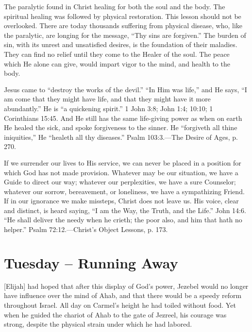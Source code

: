 \documentclass[a4paper, 10pt, twoside, headings=small]{scrartcl}
\begin{document}
\begin{multicols}{2}
The paralytic found in Christ healing for both the soul and the body. The spiritual healing was followed by physical restoration. This lesson should not be overlooked. There are today thousands suffering from physical disease, who, like the paralytic, are longing for the message, “Thy sins are forgiven.” The burden of sin, with its unrest and unsatisfied desires, is the foundation of their maladies. They can find no relief until they come to the Healer of the soul. The peace which He alone can give, would impart vigor to the mind, and health to the body.

Jesus came to “destroy the works of the devil.” “In Him was life,” and He says, “I am come that they might have life, and that they might have it more abundantly.” He is “a quickening spirit.” 1 John 3:8; John 1:4; 10:10; 1 Corinthians 15:45. And He still has the same life-giving power as when on earth He healed the sick, and spoke forgiveness to the sinner. He “forgiveth all thine iniquities,” He “healeth all thy diseases.” Psalm 103:3.—The Desire of Ages, p. 270.

If we surrender our lives to His service, we can never be placed in a position for which God has not made provision. Whatever may be our situation, we have a Guide to direct our way; whatever our perplexities, we have a sure Counselor; whatever our sorrow, bereavement, or loneliness, we have a sympathizing Friend. If in our ignorance we make missteps, Christ does not leave us. His voice, clear and distinct, is heard saying, “I am the Way, the Truth, and the Life.” John 14:6. “He shall deliver the needy when he crieth; the poor also, and him that hath no helper.” Psalm 72:12.—Christ’s Object Lessons, p. 173.

\section*{Tuesday – Running Away}

[Elijah] had hoped that after this display of God’s power, Jezebel would no longer have influence over the mind of Ahab, and that there would be a speedy reform throughout Israel. All day on Carmel’s height he had toiled without food. Yet when he guided the chariot of Ahab to the gate of Jezreel, his courage was strong, despite the physical strain under which he had labored.


\end{multicols}
\end{document}
